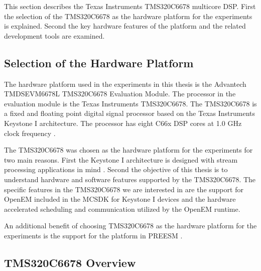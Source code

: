 This section describes the Texas Instruments TMS320C6678 multicore DSP. First the selection of the TMS320C6678 as the hardware platform for the experiments is explained. Second the key hardware features of the platform and the related development tools are examined. 

\subsection{Selection of the Hardware Platform}
The hardware platform used in the experiments in this thesis is the Advantech TMDSEVM6678L TMS320C6678 Evaluation Module. The processor in the evaluation module is the Texas Instruments TMS320C6678. The TMS320C6678 is a fixed and floating point digital signal processor based on the Texas Instruments Keystone I architecture. The processor has eight C66x DSP cores at 1.0 GHz clock frequency \cite{tmsdatasheet}. 

The TMS320C6678 was chosen as the hardware platform for the experiments for two main reasons. First the Keystone I architecture is designed with stream processing applications in mind \cite{multicorevideo}. Second the objective of this thesis is to understand hardware and software features supported by the TMS320C6678. The specific features in the TMS320C6678 we are interested in are the support for OpenEM included in the MCSDK for Keystone I devices \cite{MCSDKbrochure} and the hardware accelerated scheduling and communication utilized by the OpenEM runtime. 

An additional benefit of choosing TMS320C6678 as the hardware platform for the experiments is the support for the platform in PREESM \cite{pelcat2014preesm}.  

\subsection{TMS320C6678 Overview}

